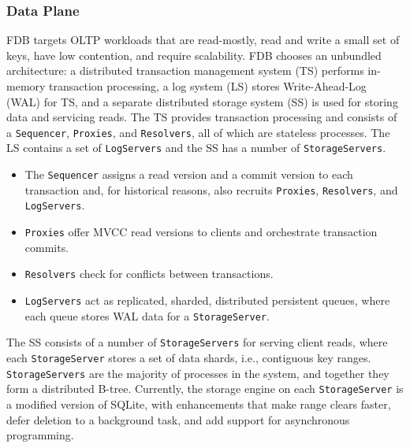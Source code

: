 \documentclass[11pt]{article}
\begin{document}
\subsubsection{Data Plane}
\label{sec:org45e5fe7}
FDB targets OLTP workloads that are read-mostly, read and write a small set of keys, have low
contention, and require scalability. FDB chooses an unbundled architecture: a distributed transaction
management system (TS) performs in-memory transaction processing, a log system (LS) stores
Write-Ahead-Log (WAL) for TS, and a separate distributed storage system (SS) is used for storing data
and servicing reads. The TS provides transaction processing and consists of a \texttt{Sequencer}, \texttt{Proxies}, and
\texttt{Resolvers}, all of which are stateless processes. The LS contains a set of \texttt{LogServers} and the SS has a
number of \texttt{StorageServers}.

\begin{itemize}
\item The \texttt{Sequencer} assigns a read version and a commit version to each transaction and, for historical
reasons, also recruits \texttt{Proxies}, \texttt{Resolvers}, and \texttt{LogServers}.
\item \texttt{Proxies} offer MVCC read versions to clients and orchestrate transaction commits.
\item \texttt{Resolvers} check for conflicts between transactions.
\item \texttt{LogServers} act as replicated, sharded, distributed persistent queues, where each queue stores WAL
data for a \texttt{StorageServer}.
\end{itemize}


The SS consists of a number of \texttt{StorageServers} for serving client reads, where each \texttt{StorageServer}
stores a set of data shards, i.e., contiguous key ranges. \texttt{StorageServers} are the majority of processes
in the system, and together they form a distributed B-tree. Currently, the storage engine on each
\texttt{StorageServer} is a modified version of SQLite, with enhancements that make range clears faster,
defer deletion to a background task, and add support for asynchronous programming.

\end{document}
